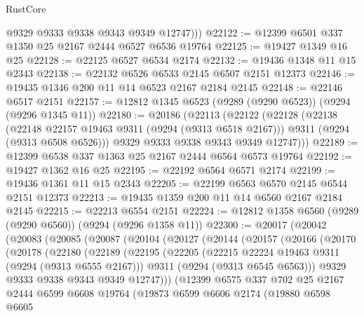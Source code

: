 \begin{lexlean}{RustCore}
\begin{coremodule}
          @9329
          @9333
          @9338
          @9343
          @9349
          @12747)))
@22122 := @12399 @6501 @337 @1350 @25 @2167 @2444 @6527 @6536 @19764
@22125 := @19427 @1349 @16 @25
@22128 := @22125 @6527 @6534 @2174
@22132 := @19436 @1348 @11 @15 @2343
@22138 := @22132 @6526 @6533 @2145 @6507 @2151 @12373
@22146 := @19435 @1346 @200 @11 @14 @6523 @2167 @2184 @2145
@22148 := @22146 @6517 @2151
@22157 := @12812 @1345 @6523 (@9289 (@9290 @6523)) (@9294 (@9296 @1345 @11))
@22180 := @20186
    (@22113
      (@22122
        (@22128
          (@22138
            (@22148 @22157 @19463 @9311 (@9294 (@9313 @6518 @2167)))
            @9311
            (@9294 (@9313 @6508 @6526)))
          @9329
          @9333
          @9338
          @9343
          @9349
          @12747)))
@22189 := @12399 @6538 @337 @1363 @25 @2167 @2444 @6564 @6573 @19764
@22192 := @19427 @1362 @16 @25
@22195 := @22192 @6564 @6571 @2174
@22199 := @19436 @1361 @11 @15 @2343
@22205 := @22199 @6563 @6570 @2145 @6544 @2151 @12373
@22213 := @19435 @1359 @200 @11 @14 @6560 @2167 @2184 @2145
@22215 := @22213 @6554 @2151
@22224 := @12812 @1358 @6560 (@9289 (@9290 @6560)) (@9294 (@9296 @1358 @11))
@22300 := @20017
    (@20042
      (@20083
        (@20085
          (@20087
            (@20104
              (@20127
                (@20144
                  (@20157
                    (@20166
                      (@20170
                        (@20178
                          (@22180
                            (@22189
                              (@22195
                                (@22205
                                  (@22215 @22224 @19463 @9311 (@9294 (@9313 @6555 @2167)))
                                  @9311
                                  (@9294 (@9313 @6545 @6563)))
                                @9329
                                @9333
                                @9338
                                @9343
                                @9349
                                @12747)))
                          (@12399
                            @6575
                            @337
                            @702
                            @25
                            @2167
                            @2444
                            @6599
                            @6608
                            @19764
                            (@19873
                              @6599
                              @6606
                              @2174
                              (@19880
                                @6598
                                @6605

\end{coremodule}
\end{lexlean}
